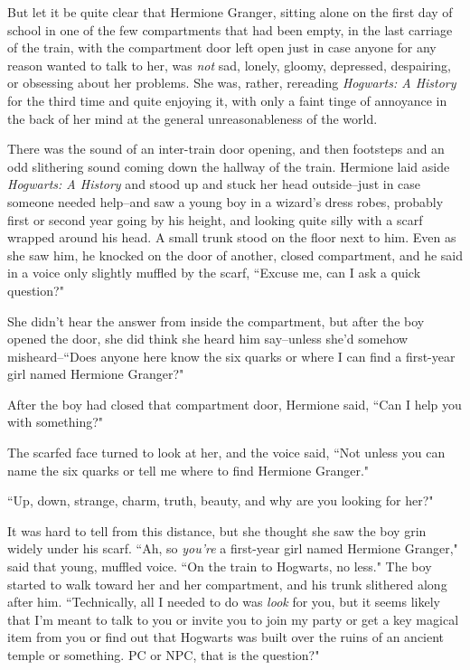 But let it be quite clear that Hermione Granger, sitting alone on the first day of school in one of the few compartments that had been empty, in the last carriage of the train, with the compartment door left open just in case anyone for any reason wanted to talk to her, was \emph{not} sad, lonely, gloomy, depressed, despairing, or obsessing about her problems. She was, rather, rereading \emph{Hogwarts: A History} for the third time and quite enjoying it, with only a faint tinge of annoyance in the back of her mind at the general unreasonableness of the world.

There was the sound of an inter-train door opening, and then footsteps and an odd slithering sound coming down the hallway of the train. Hermione laid aside \emph{Hogwarts: A History} and stood up and stuck her head outside\---just in case someone needed help\---and saw a young boy in a wizard's dress robes, probably first or second year going by his height, and looking quite silly with a scarf wrapped around his head. A small trunk stood on the floor next to him. Even as she saw him, he knocked on the door of another, closed compartment, and he said in a voice only slightly muffled by the scarf, ``Excuse me, can I ask a quick question?"

She didn't hear the answer from inside the compartment, but after the boy opened the door, she did think she heard him say\---unless she'd somehow misheard\---``Does anyone here know the six quarks or where I can find a first-year girl named Hermione Granger?"

After the boy had closed that compartment door, Hermione said, ``Can I help you with something?"

The scarfed face turned to look at her, and the voice said, ``Not unless you can name the six quarks or tell me where to find Hermione Granger."

``Up, down, strange, charm, truth, beauty, and why are you looking for her?"

It was hard to tell from this distance, but she thought she saw the boy grin widely under his scarf. ``Ah, so \emph{you're} a first-year girl named Hermione Granger," said that young, muffled voice. ``On the train to Hogwarts, no less." The boy started to walk toward her and her compartment, and his trunk slithered along after him. ``Technically, all I needed to do was \emph{look} for you, but it seems likely that I'm meant to talk to you or invite you to join my party or get a key magical item from you or find out that Hogwarts was built over the ruins of an ancient temple or something. PC or NPC, that is the question?"

